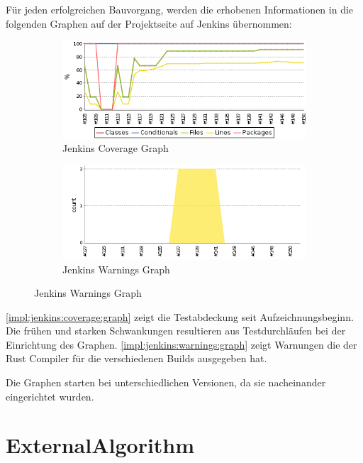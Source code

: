 Für jeden erfolgreichen Bauvorgang, werden die erhobenen Informationen in die folgenden Graphen auf der Projektseite auf Jenkins übernommen:

\begin{figure}[H]
	\centering
	\begin{subfigure}{.5\textwidth}
		\includegraphics[width=\textwidth]{images/jenkins_coverage_graph.png}
		\caption{Jenkins Coverage Graph}
		\label{impl:jenkins:coverage:graph}
	\end{subfigure}%
	\begin{subfigure}{.5\textwidth}
		\includegraphics[width=\textwidth]{images/jenkins_warnings_graph.png}
		\caption{Jenkins Warnings Graph}
		\label{impl:jenkins:warnings:graph}
	\end{subfigure}
\end{figure}

\autoref{impl:jenkins:coverage:graph} zeigt die Testabdeckung seit Aufzeichnungsbeginn.
Die frühen und starken Schwankungen resultieren aus Testdurchläufen bei der Einrichtung des Graphen.
\autoref{impl:jenkins:warnings:graph} zeigt Warnungen die der Rust Compiler für die verschiedenen Builds ausgegeben hat.

Die Graphen starten bei unterschiedlichen Versionen, da sie nacheinander eingerichtet wurden.

\section{ExternalAlgorithm}

